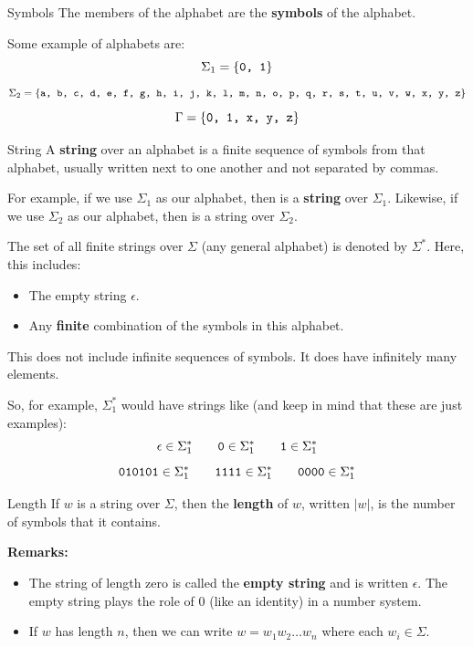 \documentclass[letterpaper]{article}
\begin{document}
\begin{definition}{Symbols}{}
    The members of the alphabet are the \textbf{symbols} of the alphabet.
\end{definition}

Some example of alphabets are: 
\[\Sigma_1 = \{\texttt{0, 1}\}\]
\[\Sigma_2 = \{\texttt{a, b, c, d, e, f, g, h, i, j, k, l, m, n, o, p, q, r, s, t, u, v, w, x, y, z}\}\]
\[\Gamma = \{\texttt{0, 1, x, y, z}\}\]

\begin{definition}{String}{}
    A \textbf{string} over an alphabet is a finite sequence of symbols from that alphabet, usually written next to one another and not separated by commas. 
\end{definition}
For example, if we use $\Sigma_1$ as our alphabet, then  is a \textbf{string} over $\Sigma_1$. Likewise, if we use $\Sigma_2$ as our alphabet, then  is a string over $\Sigma_2$. 

\bigskip

The set of all finite strings over $\Sigma$ (any general alphabet) is denoted by $\Sigma^*$. Here, this includes:
\begin{itemize}
    \item The empty string $\epsilon$.
    \item Any \textbf{finite} combination of the symbols in this alphabet.
\end{itemize}
This does not include infinite sequences of symbols. It does have infinitely many elements. 

\bigskip

So, for example, $\Sigma_{1}^{*}$ would have strings like (and keep in mind that these are just examples): 
\[\epsilon \in \Sigma_{1}^{*} \qquad \texttt{0} \in \Sigma_{1}^{*} \qquad \texttt{1} \in \Sigma_{1}^{*}\]
\[\texttt{010101} \in \Sigma_{1}^{*} \qquad \texttt{1111} \in \Sigma_{1}^{*} \qquad \texttt{0000} \in \Sigma_{1}^{*}\]

\begin{definition}{Length}{}
    If $w$ is a string over $\Sigma$, then the \textbf{length} of $w$, written $|w|$, is the number of symbols that it contains. 
\end{definition}
\textbf{Remarks:}
\begin{itemize}
    \item The string of length zero is called the \textbf{empty string} and is written $\epsilon$. The empty string plays the role of 0 (like an identity) in a number system.
    \item If $w$ has length $n$, then we can write $w = w_1 w_2 \dots w_n$ where each $w_i \in \Sigma$.
\end{itemize} 
\end{document}
